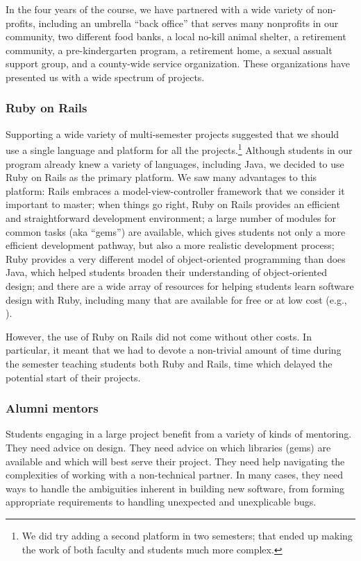 In the four years of the course, we have partnered with a wide
variety of non-profits, including an umbrella ``back office'' that
serves many nonprofits in our community, two different food banks,
a local no-kill animal shelter, a retirement community, a
pre-kindergarten program, a retirement home, a sexual assualt support
group, and a county-wide service organization.  These organizations
have presented us with a wide spectrum of projects.

\subsubsection{Ruby on Rails}

Supporting a wide variety of multi-semester projects suggested that
we should use a single language and platform for all the
projects.\footnote{We did try adding a second platform in two
semesters; that ended up making the work of both faculty and students
much more complex.}  Although students in our program already knew
a variety of languages, including Java, we decided to use Ruby on
Rails as the primary platform.  We saw many advantages to this
platform: Rails embraces a model-view-controller framework that we
consider it important to master; when things go right, Ruby on Rails
provides an efficient and straightforward development environment;
a large number of modules for common tasks (aka ``gems'') are
available, which gives students not only a more efficient development
pathway, but also a more realistic development process; Ruby
provides a very different model of object-oriented programming than
does Java, which helped students broaden their understanding of
object-oriented design; and there are a wide array of resources for
helping students learn software design with Ruby, including many
that are available for free or at low cost (e.g.,
\cite{saasbook,rails-tutorial}).

However, the use of Ruby on Rails did not come without other costs.  In
particular, it meant that we had to devote a non-trivial amount of
time during the semester teaching students both Ruby and Rails, time
which delayed the potential start of their projects.

\subsubsection{Alumni mentors}

Students engaging in a large project benefit from a variety of kinds
of mentoring.  They need advice on design.  They need advice on
which libraries (gems) are available and which will best serve their
project.  They need help navigating the complexities of working
with a non-technical partner.  In many cases, they need ways to
handle the ambiguities inherent in building new software, from
forming appropriate requirements to handling unexpected and
unexplicable bugs.

